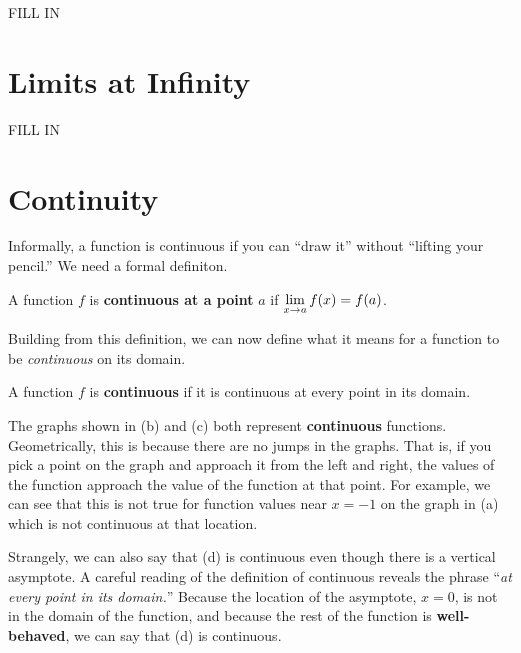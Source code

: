 \begin{exercises}

FILL IN

\end{exercises}






\section{Limits at Infinity}





\begin{exercises}

FILL IN

\end{exercises}




\section{Continuity}


Informally, a function is continuous if you can ``draw it'' without
``lifting your pencil.'' We need a formal definiton.

\begin{definition} A function $f$ is \textbf{continuous
at a point} $a$ if $\displaystyle \lim_{x\to a} f(x) = f(a)$.  
\end{definition}

Building from this definition, we can now define what it means for a function to be \textit{continuous} on its domain.

\begin{definition} A function $f$ is \textbf{continuous} if it is
continuous at every point in its domain.
\end{definition}


  The graphs shown in (b) and (c) both represent
{\bf continuous} functions.  Geometrically, this is because there are no
jumps in the graphs.  That is, if you pick a point on the graph and
approach it from the left and right, the values of the function approach
the value of the function at that point.  For example, we can see that this
is not true for function values near $x=-1$ on the graph in (a) which is
not continuous at that location.  


Strangely, we can also say that (d) is continuous even though there is a
vertical asymptote.  A careful reading of the definition of continuous
reveals the phrase ``\textit{at every point in its domain.}''  Because the
location of the asymptote, $x=0$, is not in the domain of the function, and
because the rest of the function is \textbf{well-behaved}, we can say that (d)
is continuous.

